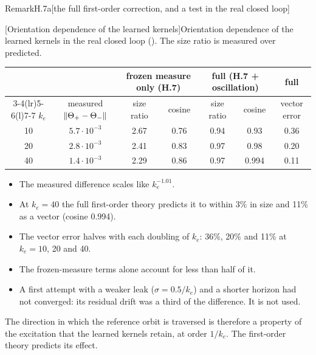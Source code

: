 \begin{rmk}{Remark}{H.7a}[the full first-order correction, and a test in the real closed loop]
\begin{center}
\small
{}[Orientation dependence of the learned kernels]{Orientation dependence of the learned kernels in the
real closed loop (). The size ratio is measured over
predicted.}
\label{tab:finitegain:orientation}
\begin{tabular}{@{}ccccccc@{}}
\toprule
 & & \multicolumn{2}{c}{frozen measure only (H.7)} & \multicolumn{2}{c}{full (H.7 + oscillation)} & full \\
\cmidrule(lr){3-4}\cmidrule(lr){5-6}\cmidrule(l){7-7}
$k_e$ & measured $\lVert \Theta_+-\Theta_-\rVert$ & size ratio & cosine & size ratio & cosine & vector error \\
\midrule
10 & $5.7\cdot10^{-3}$ & 2.67 & 0.76 & 0.94 & 0.93  & 0.36 \\
20 & $2.8\cdot10^{-3}$ & 2.41 & 0.83 & 0.97 & 0.98  & 0.20 \\
40 & $1.4\cdot10^{-3}$ & 2.29 & 0.86 & 0.97 & 0.994 & 0.11 \\
\bottomrule
\end{tabular}
\end{center}

\begin{itemize}
  \item The measured difference scales like $k_e^{-1.01}$.
  \item At $k_e=40$ the full first-order theory predicts it to within 3\% in size and 11\% as a vector (cosine 0.994).
  \item The vector error halves with each doubling of $k_e$: 36\%, 20\% and 11\% at $k_e=10$, 20 and 40.
  \item The frozen-measure terms alone account for less than half of it.
  \item A first attempt with a weaker leak ($\sigma=0.5/k_e$) and a shorter horizon had not converged: its residual
    drift was a third of the difference. It is not used.
\end{itemize}

The direction in which the reference orbit is traversed is therefore a property of the excitation that the learned
kernels retain, at order $1/k_e$. The first-order theory predicts its effect.
\end{rmk}

